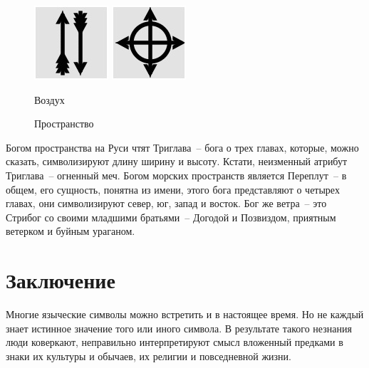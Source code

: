\documentclass[pscyr,titlepage,chapters]{hedreport}
\begin{document}
  \begin{figure}[ht]
    \center
    \includegraphics{sl_8_1} \hspace{6em}
    \includegraphics{sl_8_2} \\
    \parbox{11em}{\caption{Воздух}\label{pic-air}} \hspace{1em}
    \parbox{11em}{\caption{Пространство}\label{pic-space}}
  \end{figure}

  Богом пространства на Руси чтят Триглава~-- бога о трех главах, которые, можно
  сказать, символизируют длину ширину и высоту. Кстати, неизменный атрибут
  Триглава~-- огненный меч. Богом морских
  пространств является Переплут~-- в общем, его сущность, понятна из имени,
  этого бога представляют о четырех главах, они символизируют север, юг, запад и
  восток. Бог же ветра~-- это Стрибог со своими младшими братьями~-- Догодой и
  Позвиздом, приятным ветерком и буйным ураганом.

  \chapter*{Заключение}

  Многие языческие символы можно встретить и в настоящее время. Но не каждый
  знает истинное значение того или иного символа. В результате такого незнания
  люди коверкают, неправильно интерпретируют смысл вложенный предками в знаки их
  культуры и обычаев, их религии и повседневной жизни.

  \pagebreak
\end{document}
